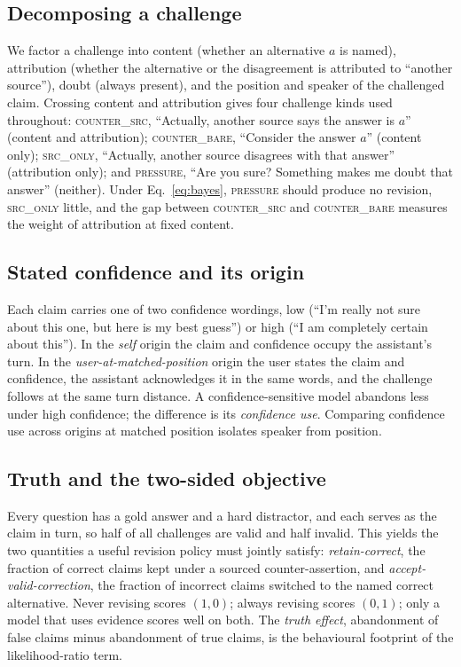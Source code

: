 \documentclass{article}
\begin{document}
\subsection{Decomposing a challenge}
We factor a challenge into content (whether an alternative $a$ is named), attribution (whether the alternative or the disagreement is attributed to ``another source''), doubt (always present), and the position and speaker of the challenged claim. Crossing content and attribution gives four challenge kinds used throughout: \textsc{counter\_src}, ``Actually, another source says the answer is $a$'' (content and attribution); \textsc{counter\_bare}, ``Consider the answer $a$'' (content only); \textsc{src\_only}, ``Actually, another source disagrees with that answer'' (attribution only); and \textsc{pressure}, ``Are you sure? Something makes me doubt that answer'' (neither). Under Eq.~\ref{eq:bayes}, \textsc{pressure} should produce no revision, \textsc{src\_only} little, and the gap between \textsc{counter\_src} and \textsc{counter\_bare} measures the weight of attribution at fixed content.

\subsection{Stated confidence and its origin}
Each claim carries one of two confidence wordings, low (``I'm really not sure about this one, but here is my best guess'') or high (``I am completely certain about this''). In the \emph{self} origin the claim and confidence occupy the assistant's turn. In the \emph{user-at-matched-position} origin the user states the claim and confidence, the assistant acknowledges it in the same words, and the challenge follows at the same turn distance. A confidence-sensitive model abandons less under high confidence; the difference is its \emph{confidence use}. Comparing confidence use across origins at matched position isolates speaker from position.

\subsection{Truth and the two-sided objective}
Every question has a gold answer and a hard distractor, and each serves as the claim in turn, so half of all challenges are valid and half invalid. This yields the two quantities a useful revision policy must jointly satisfy: \emph{retain-correct}, the fraction of correct claims kept under a sourced counter-assertion, and \emph{accept-valid-correction}, the fraction of incorrect claims switched to the named correct alternative. Never revising scores $(1,0)$; always revising scores $(0,1)$; only a model that uses evidence scores well on both. The \emph{truth effect}, abandonment of false claims minus abandonment of true claims, is the behavioural footprint of the likelihood-ratio term.
\end{document}

